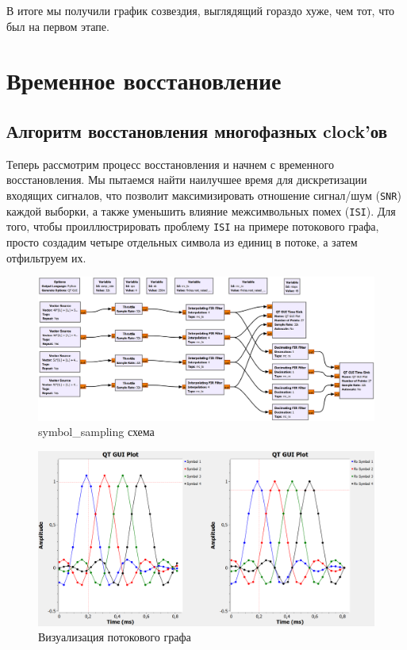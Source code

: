 \documentclass[a4paper,12pt]{report}
\begin{document}
В итоге мы получили график созвездия, выглядящий гораздо хуже, чем тот, что был на первом этапе.

\chapter{Временное восстановление}

\section{Алгоритм восстановления многофазных clock'ов}

Теперь рассмотрим процесс восстановления и начнем с временного восстановления. Мы пытаемся найти наилучшее время для дискретизации входящих сигналов, что позволит максимизировать отношение сигнал/шум (\texttt{SNR}) каждой выборки, а также уменьшить влияние межсимвольных помех (\texttt{ISI}). Для того, чтобы проиллюстрировать проблему \texttt{ISI} на примере потокового графа, просто создадим четыре отдельных символа из единиц в потоке, а затем отфильтруем их.

\begin{figure}[H]
        \centering
        \includegraphics[width=1.0\textwidth]{lab12_fig3_1.png}
        \caption{symbol\_sampling схема}
        \label{fig:lab12_fig3_1}
\end{figure}

\begin{figure}[H]
        \centering
        \includegraphics[width=1.0\textwidth]{lab12_fig3_2.png}
        \caption{Визуализация потокового графа}
        \label{fig:lab12_fig3_2}
\end{figure}
\end{document}
